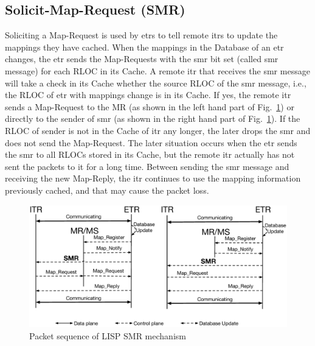 \subsection{Solicit-Map-Request (SMR)}
\label{sec:SMR}
Soliciting a Map-Request is used by \acrshort{etr}s to tell remote \acrshort{itr}s to update the mappings they have cached. When the mappings in the Database of an \acrshort{etr} changes, the \acrshort{etr} sends the Map-Requests with the \acrshort{smr} bit set (called \acrfull{smr} message) for each RLOC in its Cache. A remote \acrshort{itr} that receives the \acrshort{smr} message will take a check in its Cache whether the source RLOC of the \acrshort{smr} message, i.e., the RLOC of \acrshort{etr} with mappings change is in its Cache. If yes, the remote \acrshort{itr} sends a Map-Request to the MR (as shown in the left hand part of Fig.~\ref{SMR_schema}) or directly to the sender of \acrshort{smr} (as shown in the right hand part of Fig.~\ref{SMR_schema}). %
If the RLOC of sender is not in the Cache of \acrshort{itr} any longer, the later drops the \acrshort{smr} and does not send the Map-Request. The later situation occurs when the \acrshort{etr} sends the \acrshort{smr} to all RLOCs stored in its Cache, but the remote \acrshort{itr} actually has not sent the packets to it for a long time. Between sending the \acrshort{smr} message and receiving the new Map-Reply, the \acrshort{itr} continues to use the mapping information previously cached, and that may cause the packet loss.
\begin{figure}[!t]
	\centering
	\includegraphics[width=\textwidth]{Pics/SMR_schema.eps}
	\caption{Packet sequence of LISP SMR mechanism}
	\label{SMR_schema}
\end{figure}


